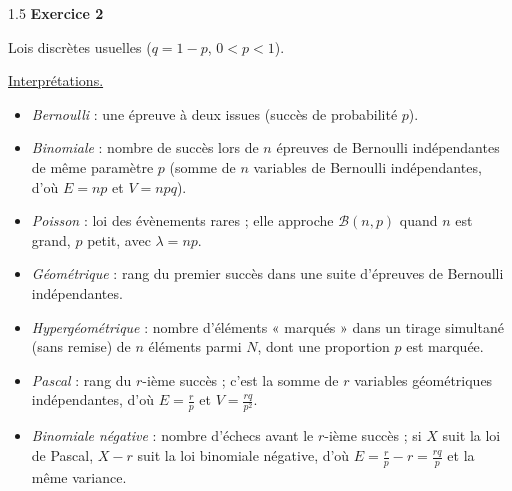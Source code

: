\documentclass[12pt]{article}
\begin{document}
\begin{spacing}{1.5}
\medskip\textbf{Exercice 2}

Lois discrètes usuelles ($q=1-p$, $0<p<1$).

\begin{center}
\renewcommand{\arraystretch}{2.2}
\end{center}

\underline{Interprétations.}
\begin{itemize}
\item \emph{Bernoulli} : une épreuve à deux issues (succès de probabilité $p$).
\item \emph{Binomiale} : nombre de succès lors de $n$ épreuves de Bernoulli indépendantes de même paramètre $p$ (somme de $n$ variables de Bernoulli indépendantes, d'où $E=np$ et $V=npq$).
\item \emph{Poisson} : loi des évènements rares ; elle approche $\mathcal{B}(n,p)$ quand $n$ est grand, $p$ petit, avec $\lambda=np$.
\item \emph{Géométrique} : rang du premier succès dans une suite d'épreuves de Bernoulli indépendantes.
\item \emph{Hypergéométrique} : nombre d'éléments « marqués » dans un tirage simultané (sans remise) de $n$ éléments parmi $N$, dont une proportion $p$ est marquée.
\item \emph{Pascal} : rang du $r$-ième succès ; c'est la somme de $r$ variables géométriques indépendantes, d'où $E=\frac rp$ et $V=\frac{rq}{p^2}$.
\item \emph{Binomiale négative} : nombre d'échecs avant le $r$-ième succès ; si $X$ suit la loi de Pascal, $X-r$ suit la loi binomiale négative, d'où $E=\frac rp-r=\frac{rq}{p}$ et la même variance.
\end{itemize}


\end{spacing}
\end{document}
